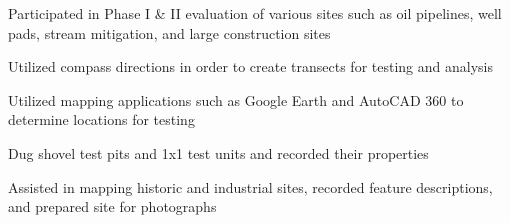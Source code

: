 \documentclass[letterpaper]{resume}
\begin{document}
%
\begin{compactitem}
\item Participated in Phase I \& II evaluation of various sites such as oil pipelines, well pads, stream mitigation, and large construction sites
\item Utilized compass directions in order to create transects for testing and analysis
\item Utilized mapping applications such as Google Earth and AutoCAD 360 to determine locations for testing
\item Dug shovel test pits and 1x1 test units and recorded their properties
\item Assisted in mapping historic and industrial sites, recorded feature descriptions, and prepared site for photographs
\end{compactitem}



\end{document}
